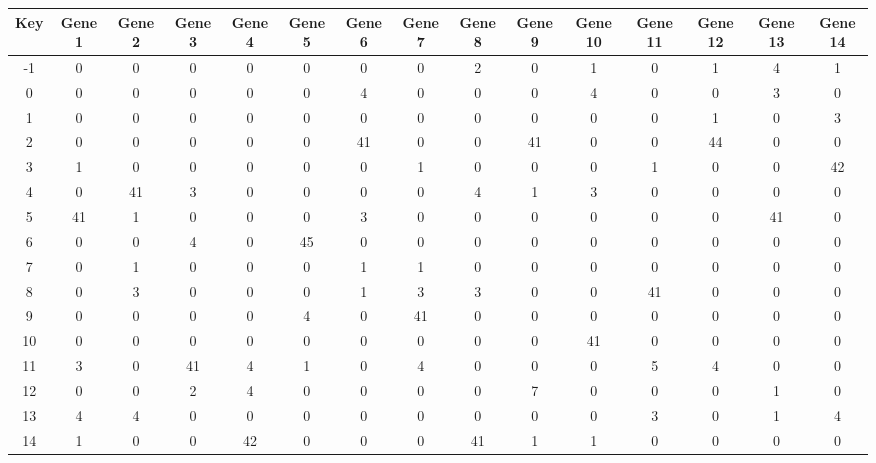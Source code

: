 \begin{tabular}{|c|c|c|c|c|c|c|c|c|c|c|c|c|c|c|}
\hline
Key & Gene 1 & Gene 2 & Gene 3 & Gene 4 & Gene 5 & Gene 6 & Gene 7 & Gene 8 & Gene 9 & Gene 10 & Gene 11 & Gene 12 & Gene 13 & Gene 14 \\
\hline
-1 & 0 & 0 & 0 & 0 & 0 & 0 & 0 & 2 & 0 & 1 & 0 & 1 & 4 & 1 \\
0 & 0 & 0 & 0 & 0 & 0 & 4 & 0 & 0 & 0 & 4 & 0 & 0 & 3 & 0 \\
1 & 0 & 0 & 0 & 0 & 0 & 0 & 0 & 0 & 0 & 0 & 0 & 1 & 0 & 3 \\
2 & 0 & 0 & 0 & 0 & 0 & 41 & 0 & 0 & 41 & 0 & 0 & 44 & 0 & 0 \\
3 & 1 & 0 & 0 & 0 & 0 & 0 & 1 & 0 & 0 & 0 & 1 & 0 & 0 & 42 \\
4 & 0 & 41 & 3 & 0 & 0 & 0 & 0 & 4 & 1 & 3 & 0 & 0 & 0 & 0 \\
5 & 41 & 1 & 0 & 0 & 0 & 3 & 0 & 0 & 0 & 0 & 0 & 0 & 41 & 0 \\
6 & 0 & 0 & 4 & 0 & 45 & 0 & 0 & 0 & 0 & 0 & 0 & 0 & 0 & 0 \\
7 & 0 & 1 & 0 & 0 & 0 & 1 & 1 & 0 & 0 & 0 & 0 & 0 & 0 & 0 \\
8 & 0 & 3 & 0 & 0 & 0 & 1 & 3 & 3 & 0 & 0 & 41 & 0 & 0 & 0 \\
9 & 0 & 0 & 0 & 0 & 4 & 0 & 41 & 0 & 0 & 0 & 0 & 0 & 0 & 0 \\
10 & 0 & 0 & 0 & 0 & 0 & 0 & 0 & 0 & 0 & 41 & 0 & 0 & 0 & 0 \\
11 & 3 & 0 & 41 & 4 & 1 & 0 & 4 & 0 & 0 & 0 & 5 & 4 & 0 & 0 \\
12 & 0 & 0 & 2 & 4 & 0 & 0 & 0 & 0 & 7 & 0 & 0 & 0 & 1 & 0 \\
13 & 4 & 4 & 0 & 0 & 0 & 0 & 0 & 0 & 0 & 0 & 3 & 0 & 1 & 4 \\
14 & 1 & 0 & 0 & 42 & 0 & 0 & 0 & 41 & 1 & 1 & 0 & 0 & 0 & 0 \\
\hline
\end{tabular}